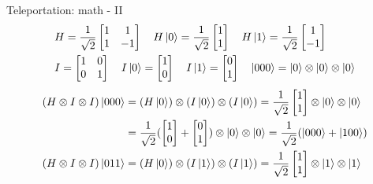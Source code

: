 \documentclass{beamer}
\begin{document}
\begin{frame}{Teleportation: math - II}
  {\tiny
    \begin{align*}
      & H =
      \frac{1}{\sqrt{2}}
      \begin{bmatrix} 1 & 1 \\ 1 & -1 \end{bmatrix}
      \quad
      H \ket{0}  = \frac{1}{\sqrt{2}} \begin{bmatrix} 1 \\ 1 \end{bmatrix} 
      \quad
      H \ket{1}  = \frac{1}{\sqrt{2}} \begin{bmatrix} 1 \\ -1 \end{bmatrix}
      \\
      & I =
      \begin{bmatrix} 1 & 0 \\ 0 & 1 \end{bmatrix}
      \quad
      I \ket{0}  = \begin{bmatrix} 1 \\ 0 \end{bmatrix} 
      \quad
      I \ket{1}  = \begin{bmatrix} 0 \\ 1 \end{bmatrix}
      \quad
      \ket{000} = \ket{0} \otimes \ket{0} \otimes \ket{0} \\
    \end{align*}
    \begin{align*}
      (H \otimes I \otimes I) \ket{000} & = (H \ket{0}) \otimes (I \ket{0}) \otimes (I \ket{0})
      =\frac{1}{\sqrt{2}} \begin{bmatrix} 1 \\ 1 \end{bmatrix} \otimes \ket{0} \otimes \ket{0} \\
      & =\frac{1}{\sqrt{2}} (\begin{bmatrix} 1 \\ 0 \end{bmatrix} + \begin{bmatrix} 0 \\ 1 \end{bmatrix}) \otimes \ket{0} \otimes  \ket{0}
      =\frac{1}{\sqrt{2}} (\ket{000} + \ket{100})
      \\
      (H \otimes I \otimes I) \ket{011} & = (H \ket{0}) \otimes (I \ket{1}) \otimes (I \ket{1})
      =\frac{1}{\sqrt{2}} \begin{bmatrix} 1 \\ 1 \end{bmatrix} \otimes \ket{1} \otimes \ket{1} \\

\end{align*}}
\end{frame}
\end{document}
